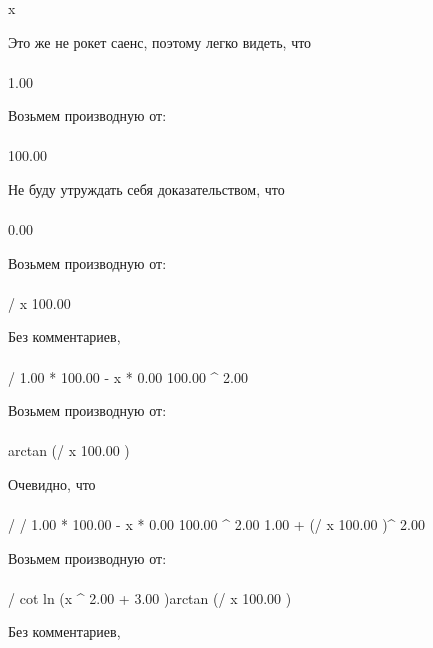 \begin{}
x \\
\end{}
Это же не рокет саенс, поэтому легко видеть, что
\begin{gather}
\end{gather}
\begin{}
1.00 \\
\end{}
Возьмем производную от:
\begin{gather}
\end{gather}
\begin{}
100.00 \\
\end{}
Не буду утруждать себя доказательством, что
\begin{gather}
\end{gather}
\begin{}
0.00 \\
\end{}
Возьмем производную от:
\begin{gather}
\end{gather}
\begin{}
/ {x }{100.00 }\\
\end{}
Без комментариев, 
\begin{gather}
\end{gather}
\begin{}
/ {1.00 * 100.00 - x * 0.00 }{100.00 ^ {2.00 }}\\
\end{}
Возьмем производную от:
\begin{gather}
\end{gather}
\begin{}
arctan (/ {x }{100.00 })\\
\end{}
Очевидно, что
\begin{gather}
\end{gather}
\begin{}
/ {/ {1.00 * 100.00 - x * 0.00 }{100.00 ^ {2.00 }}}{1.00 + (/ {x }{100.00 })^ {2.00 }}\\
\end{}
Возьмем производную от:
\begin{gather}
\end{gather}
\begin{}
/ {cot ln (x ^ {2.00 }+ 3.00 )}{arctan (/ {x }{100.00 })}\\
\end{}
Без комментариев, 
